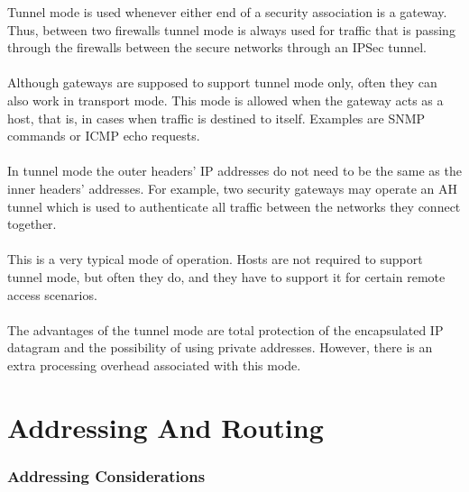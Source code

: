\documentclass[10pt,a4paper]{article}
\begin{document}
\begin{itemize}
\begin{itemize}
\begin{itemize}
Tunnel mode is used whenever either end of a security association is a gateway.
Thus, between two firewalls tunnel mode is always used for traffic that is passing
through the firewalls between the secure networks through an IPSec tunnel.
\\
\\
Although gateways are supposed to support tunnel mode only, often they can
also work in transport mode. This mode is allowed when the gateway acts as a
host, that is, in cases when traffic is destined to itself. Examples are SNMP
commands or ICMP echo requests.
\\
\\
In tunnel mode the outer headers' IP addresses do not need to be the same as
the inner headers' addresses. For example, two security gateways may operate
an AH tunnel which is used to authenticate all traffic between the networks they
connect together.
\\
\\
 This is a very typical mode of operation. Hosts are not required
to support tunnel mode, but often they do, and they have to support it for certain
remote access scenarios.
\\
\\
The advantages of the tunnel mode are total protection of the encapsulated IP
datagram and the possibility of using private addresses. However, there is an
extra processing overhead associated with this mode.
\newpage
\part{Addressing And Routing}
\section{Addressing Considerations}

\end{itemize}
\end{itemize}
\end{itemize}
\end{document}
